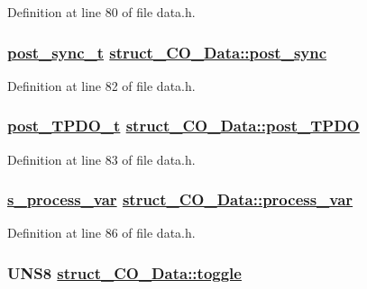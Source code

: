 Definition at line 80 of file data.h.\hypertarget{structstruct__CO__Data_7eeaefe180dfceca6e829a0a8018f342}{
\subsubsection[post\_\-sync]{\setlength{\rightskip}{0pt plus 5cm}\hyperlink{sync_8h_8a0b5b8c19b375ef1c985caa120f3274}{post\_\-sync\_\-t} \hyperlink{structstruct__CO__Data_7eeaefe180dfceca6e829a0a8018f342}{struct\_\-CO\_\-Data::post\_\-sync}}}
\label{structstruct__CO__Data_7eeaefe180dfceca6e829a0a8018f342}




Definition at line 82 of file data.h.\hypertarget{structstruct__CO__Data_0cf540e2e36e14c04e1c783dc88d9a0e}{
\subsubsection[post\_\-TPDO]{\setlength{\rightskip}{0pt plus 5cm}\hyperlink{sync_8h_b9bc4632750ad12f918aa22a1eb7756b}{post\_\-TPDO\_\-t} \hyperlink{structstruct__CO__Data_0cf540e2e36e14c04e1c783dc88d9a0e}{struct\_\-CO\_\-Data::post\_\-TPDO}}}
\label{structstruct__CO__Data_0cf540e2e36e14c04e1c783dc88d9a0e}




Definition at line 83 of file data.h.\hypertarget{structstruct__CO__Data_26f4d508a9e409f2ace9c8c55d92d826}{
\subsubsection[process\_\-var]{\setlength{\rightskip}{0pt plus 5cm}\hyperlink{structstruct__s__process__var}{s\_\-process\_\-var} \hyperlink{structstruct__CO__Data_26f4d508a9e409f2ace9c8c55d92d826}{struct\_\-CO\_\-Data::process\_\-var}}}
\label{structstruct__CO__Data_26f4d508a9e409f2ace9c8c55d92d826}




Definition at line 86 of file data.h.\hypertarget{structstruct__CO__Data_01f012ef56b614a9519530433b01054f}{
\subsubsection[toggle]{\setlength{\rightskip}{0pt plus 5cm}UNS8 \hyperlink{structstruct__CO__Data_01f012ef56b614a9519530433b01054f}{struct\_\-CO\_\-Data::toggle}}}
\label{structstruct__CO__Data_01f012ef56b614a9519530433b01054f}




